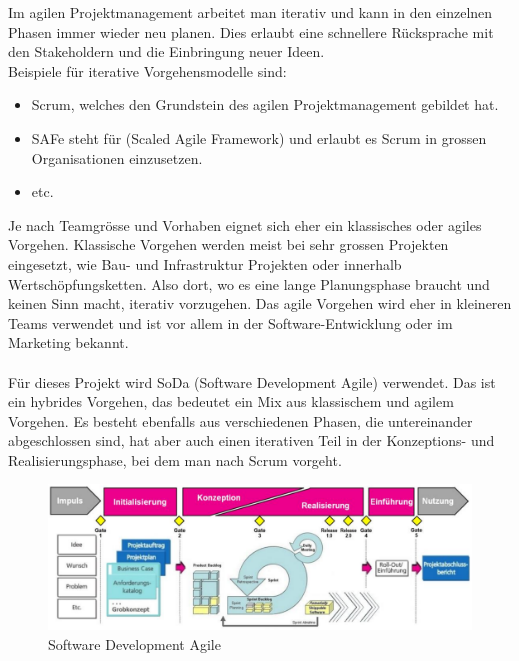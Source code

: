 \documentclass[a4paper, table]{article}
\begin{document}
Im agilen Projektmanagement arbeitet man iterativ und kann in den einzelnen Phasen immer wieder neu planen. 
Dies erlaubt eine schnellere Rücksprache mit den Stakeholdern und die Einbringung neuer Ideen.\\
Beispiele für iterative Vorgehensmodelle sind:
\begin{itemize}
    \item Scrum, welches den Grundstein des agilen Projektmanagement gebildet hat.
    \item SAFe steht für (Scaled Agile Framework) und erlaubt es Scrum in grossen Organisationen einzusetzen.
    \item etc. \autocite{noauthor_liste_2022}
\end{itemize}

Je nach Teamgrösse und Vorhaben eignet sich eher ein klassisches oder agiles Vorgehen. 
Klassische Vorgehen werden meist bei sehr grossen Projekten eingesetzt, wie Bau- und Infrastruktur Projekten oder innerhalb Wertschöpfungsketten. 
Also dort, wo es eine lange Planungsphase braucht und keinen Sinn macht, iterativ vorzugehen. 
Das agile Vorgehen wird eher in kleineren Teams verwendet und ist vor allem in der Software-Entwicklung oder im Marketing bekannt.\\\\
Für dieses Projekt wird \gls{SoDa} (Software Development Agile) verwendet. 
Das ist ein hybrides Vorgehen, das bedeutet ein Mix aus klassischem und agilem Vorgehen. 
Es besteht ebenfalls aus verschiedenen Phasen, die untereinander abgeschlossen sind, hat aber auch einen iterativen Teil in der Konzeptions- und Realisierungsphase, bei dem man nach Scrum vorgeht.

\begin{figure}[h]
    \centering
    \includegraphics[width=1.0\textwidth]{img/SoDa.png}
    \caption{Software Development Agile}
    \label{fig:SoDa}
\end{figure}
\end{document}
